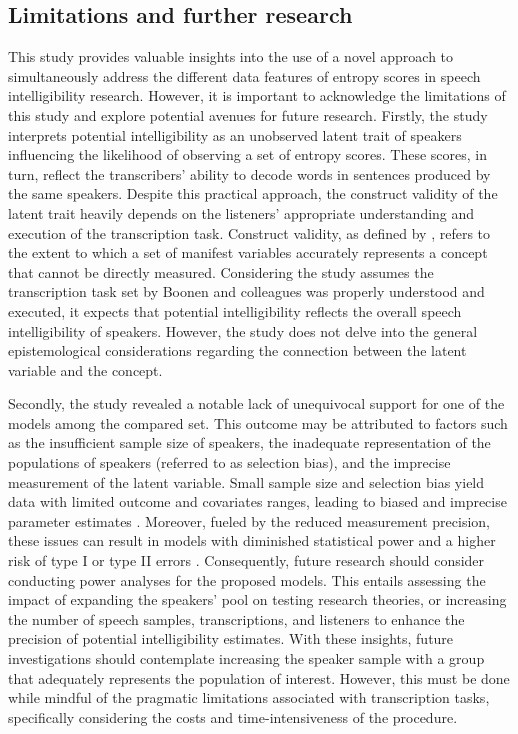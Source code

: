 \documentclass[
  authoryear,
  preprint,
  1p]{elsarticle}
\begin{document}
\subsection{Limitations and further research}\label{sec-D-LFR}

This study provides valuable insights into the use of a novel approach
to simultaneously address the different data features of entropy scores
in speech intelligibility research. However, it is important to
acknowledge the limitations of this study and explore potential avenues
for future research. Firstly, the study interprets potential
intelligibility as an unobserved latent trait of speakers influencing
the likelihood of observing a set of entropy scores. These scores, in
turn, reflect the transcribers' ability to decode words in sentences
produced by the same speakers. Despite this practical approach, the
construct validity of the latent trait heavily depends on the listeners'
appropriate understanding and execution of the transcription task.
Construct validity, as defined by \citet{Cronbach_et_al_1955}, refers to
the extent to which a set of manifest variables accurately represents a
concept that cannot be directly measured. Considering the study assumes
the transcription task set by Boonen and colleagues
\citeyearpar{Boonen_et_al_2021} was properly understood and executed, it
expects that potential intelligibility reflects the overall speech
intelligibility of speakers. However, the study does not delve into the
general epistemological considerations regarding the connection between
the latent variable and the concept.

Secondly, the study revealed a notable lack of unequivocal support for
one of the models among the compared set. This outcome may be attributed
to factors such as the insufficient sample size of speakers, the
inadequate representation of the populations of speakers (referred to as
selection bias), and the imprecise measurement of the latent variable.
Small sample size and selection bias yield data with limited outcome and
covariates ranges, leading to biased and imprecise parameter estimates
\citep{Everitt_et_al_2010}. Moreover, fueled by the reduced measurement
precision, these issues can result in models with diminished statistical
power and a higher risk of type I or type II errors
\citep{McElreath_2020}. Consequently, future research should consider
conducting power analyses for the proposed models. This entails
assessing the impact of expanding the speakers' pool on testing research
theories, or increasing the number of speech samples, transcriptions,
and listeners to enhance the precision of potential intelligibility
estimates. With these insights, future investigations should contemplate
increasing the speaker sample with a group that adequately represents
the population of interest. However, this must be done while mindful of
the pragmatic limitations associated with transcription tasks,
specifically considering the costs and time-intensiveness of the
procedure.
\end{document}
